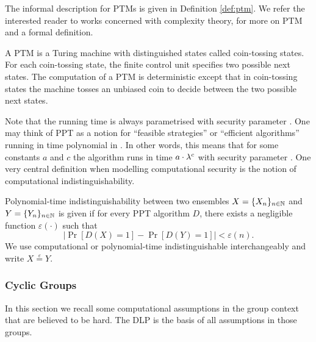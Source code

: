 \noindent
The informal description for \aclp{PTM} is given in Definition \ref{def:ptm}.
We refer the interested reader to works concerned with complexity theory, \eg \cite{santos1969,WaterlooComplexity} for more on \ac{PTM} and a formal definition.

\begin{definition}\label{def:ptm}
A \ac{PTM} is a Turing machine with distinguished states called coin-tossing states.
For each coin-tossing state, the finite control unit specifies two possible next states.
The computation of a \ac{PTM} is deterministic except that in coin-tossing states the machine tosses an unbiased coin to decide between the two possible next states.
\eod
\end{definition}

\noindent
Note that the running time is always parametrised with security parameter \secpar.
One may think of \ac{PPT} as a notion for ``feasible strategies'' or ``efficient algorithms'' running in time polynomial in \secpar.
In other words, this means that for some constants $a$ and $c$ the algorithm runs in time $a\cdot \lambda^c$ with security parameter \secpar.
One very central definition when modelling computational security is the notion of computational indistinguishability.

\begin{definition}
Polynomial-time indistinguishability between two ensembles $X=\{X_n\}_{n\in\mathbb{N}}$ and $Y=\{Y_n\}_{n\in\mathbb{N}}$ is given if for every \ac{PPT} algorithm $D$, there exists a negligible function $\varepsilon(\cdot)$ such that
\[
  \left| \Pr[D(X) = 1] - \Pr[D(Y) = 1] \right| < \varepsilon(n).
\]
We use computational or polynomial-time indistinguishable interchangeably and write $X\stackrel{\varepsilon}{=}Y$.
\eod
\end{definition}

\subsubsection{Cyclic Groups}
In this section we recall some computational assumptions in the group context that are believed to be hard.
The \ac{DLP} is the basis of all assumptions in those groups.

